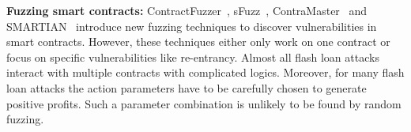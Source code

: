 \noindent \textbf{Fuzzing smart contracts:}
ContractFuzzer~\cite{jiang2018contractfuzzer}, sFuzz~\cite{nguyen2020sfuzz},
ContraMaster~\cite{wang2020oracle} and SMARTIAN~\cite{choi2021smartian}
introduce new fuzzing techniques to discover vulnerabilities in smart
contracts. However, these techniques either only work on one contract or focus
on specific vulnerabilities like re-entrancy. Almost all flash loan attacks
interact with multiple contracts with complicated logics. Moreover, for many
flash loan attacks the action parameters have to be carefully chosen to
generate positive profits. Such a parameter combination is unlikely to be found
by random fuzzing.
